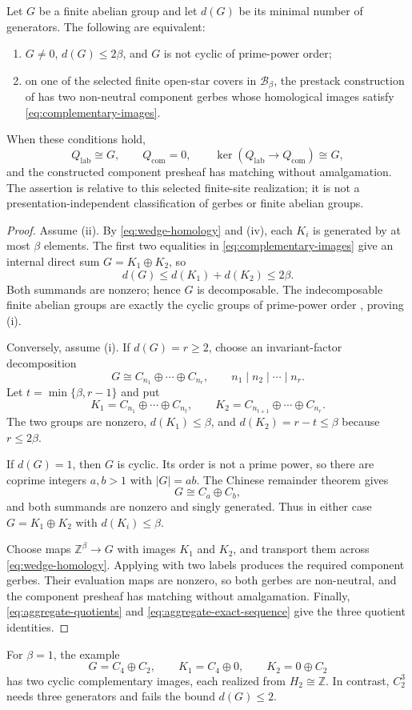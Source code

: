 \begin{corollary}
\label{thm:wedge-sphere-two-component-label-loss}
Let \(G\) be a finite abelian group and let \(d(G)\) be its minimal number
of generators.  The following are equivalent:
\begin{enumerate}[label=(\roman*),nosep]
\item \(G\ne0\), \(d(G)\le2\beta\), and \(G\) is not cyclic of
      prime-power order;
\item on one of the selected finite open-star covers in
      \(\mathcal B_\beta\), the prestack construction of
       has two non-neutral
      component gerbes whose homological images satisfy
      \eqref{eq:complementary-images}.
\end{enumerate}
When these conditions hold,
\[
 Q_{\mathrm{lab}}\cong G,
 \qquad Q_{\mathrm{com}}=0,
 \qquad
 \ker(Q_{\mathrm{lab}}\to Q_{\mathrm{com}})\cong G,
\]
and the constructed component presheaf has matching without amalgamation.
The assertion is relative to this selected finite-site realization; it is not
a presentation-independent classification of gerbes or finite abelian groups.
\end{corollary}

\begin{proof}
Assume (ii).  By \eqref{eq:wedge-homology} and
(iv), each \(K_i\) is generated by at most
\(\beta\) elements.  The first two equalities in
\eqref{eq:complementary-images} give an internal direct sum
\(G=K_1\oplus K_2\), so
\[
 d(G)\le d(K_1)+d(K_2)\le2\beta.
\]
Both summands are nonzero; hence \(G\) is decomposable.  The indecomposable
finite abelian groups are exactly the cyclic groups of prime-power order
\cite[Chap.~12]{DummitFoote2004}, proving (i).

Conversely, assume (i).  If \(d(G)=r\ge2\), choose an invariant-factor
decomposition
\[
 G\cong C_{n_1}\oplus\cdots\oplus C_{n_r},
 \qquad n_1\mid n_2\mid\cdots\mid n_r.
\]
Let \(t=\min\{\beta,r-1\}\) and put
\[
 K_1=C_{n_1}\oplus\cdots\oplus C_{n_t},
 \qquad
 K_2=C_{n_{t+1}}\oplus\cdots\oplus C_{n_r}.
\]
The two groups are nonzero, \(d(K_1)\le\beta\), and
\(d(K_2)=r-t\le\beta\) because \(r\le2\beta\).

If \(d(G)=1\), then \(G\) is cyclic.  Its order is not a prime power, so
there are coprime integers \(a,b>1\) with \(|G|=ab\).  The Chinese remainder
theorem gives
\[
 G\cong C_a\oplus C_b,
\]
and both summands are nonzero and singly generated.  Thus in either case
\(G=K_1\oplus K_2\) with \(d(K_i)\le\beta\).

Choose maps \(\mathbb Z^\beta\to G\) with images \(K_1\) and \(K_2\), and
transport them across \eqref{eq:wedge-homology}.  Applying
 with two labels produces
the required component gerbes.  Their evaluation maps are nonzero, so both
gerbes are non-neutral, and the component presheaf has matching without
amalgamation.  Finally, \eqref{eq:aggregate-quotients} and
\eqref{eq:aggregate-exact-sequence} give the three quotient identities.
\end{proof}

For \(\beta=1\), the example
\[
 G=C_4\oplus C_2,
 \qquad K_1=C_4\oplus0,
 \qquad K_2=0\oplus C_2
\]
has two cyclic complementary images, each realized from
\(H_2\cong\mathbb Z\).  In contrast, \(C_2^3\) needs three generators and
fails the bound \(d(G)\le2\).
